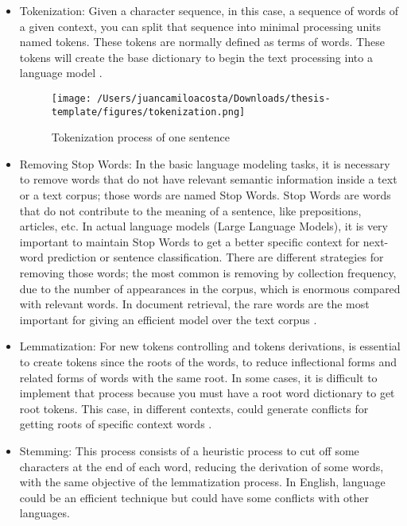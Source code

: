 \begin{itemize}
    \item Tokenization: Given a character sequence, in this case, a sequence of words of a given context, you can split that sequence into minimal processing units named tokens. These tokens are normally defined as terms of words. These tokens will create the base dictionary to begin the text processing into a language model \citet{information-retrieval}. 

    \begin{figure}[H]
    \centering
    \texttt{[image: /Users/juancamiloacosta/Downloads/thesis-template/figures/tokenization.png]}
    \caption{Tokenization process of one sentence \citet{information-retrieval} }
    \label{fig:tokenization}
    \end{figure}
    
    \item Removing Stop Words: In the basic language modeling tasks, it is necessary to remove words that do not have relevant semantic information inside a text or a text corpus; those words are named Stop Words. Stop Words are words that do not contribute to the meaning of a sentence, like prepositions, articles, etc. In actual language models (Large Language Models), it is very important to maintain Stop Words to get a better specific context for next-word prediction or sentence classification. There are different strategies for removing those words; the most common is removing by collection frequency, due to the number of appearances in the corpus, which is enormous compared with relevant words. In document retrieval, the rare words are the most important for giving an efficient model over the text corpus \citet{information-retrieval}. 
    \item Lemmatization: For new tokens controlling and tokens derivations, is essential to create tokens since the roots of the words, to reduce inflectional forms and related forms of words with the same root. In some cases, it is difficult to implement that process because you must have a root word dictionary to get root tokens. This case, in different contexts, could generate conflicts for getting roots of specific context words \cite{information-retrieval}.
    \item Stemming: This process consists of a heuristic process to cut off some characters at the end of each word, reducing the derivation of some words, with the same objective of the lemmatization process. In English, language could be an efficient technique but could have some conflicts with other languages.
\end{itemize}


